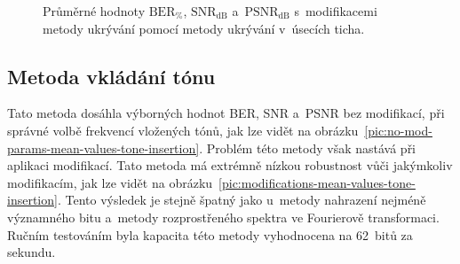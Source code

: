 \begin{figure}[H]
    \table
    \centering
    \caption{Průměrné hodnoty $\mathrm{BER}_{\%}$, $\mathrm{SNR}_\mathrm{dB}$
    a~$\mathrm{PSNR}_\mathrm{dB}$ s~modifikacemi metody ukrývání pomocí
    metody ukrývání v~úsecích ticha.}
    \label{pic:modifications-mean-values-silence-interval}
\end{figure}

\subsection*{Metoda vkládání tónu}

Tato metoda dosáhla výborných hodnot BER, SNR a~PSNR bez modifikací, při
správné volbě frekvencí vložených tónů, jak lze vidět na
obrázku~\ref{pic:no-mod-params-mean-values-tone-insertion}. Problém této metody
však nastává při aplikaci modifikací. Tato metoda má extrémně nízkou robustnost
vůči jakýmkoliv modifikacím, jak lze vidět na
obrázku~\ref{pic:modifications-mean-values-tone-insertion}. Tento výsledek je
stejně špatný jako u~metody nahrazení nejméně významného bitu a~metody
rozprostřeného spektra ve Fourierově transformaci. Ručním testováním byla
kapacita této metody vyhodnocena na 62~bitů za sekundu.

